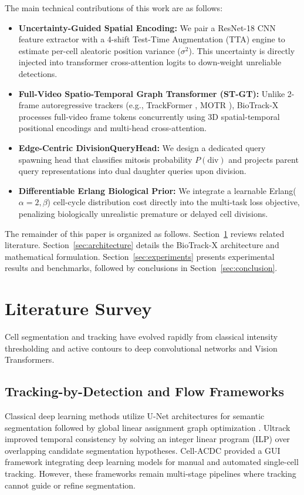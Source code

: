 \documentclass[10pt,journal,compsoc]{IEEEtran}
\begin{document}
The main technical contributions of this work are as follows:
\begin{itemize}
    \item \textbf{Uncertainty-Guided Spatial Encoding:} We pair a ResNet-18 CNN feature extractor with a 4-shift Test-Time Augmentation (TTA) engine to estimate per-cell aleatoric position variance ($\sigma^2$). This uncertainty is directly injected into transformer cross-attention logits to down-weight unreliable detections.
    \item \textbf{Full-Video Spatio-Temporal Graph Transformer (ST-GT):} Unlike 2-frame autoregressive trackers (e.g., TrackFormer \cite{trackformer}, MOTR \cite{motr}), BioTrack-X processes full-video frame tokens concurrently using 3D spatial-temporal positional encodings and multi-head cross-attention.
    \item \textbf{Edge-Centric DivisionQueryHead:} We design a dedicated query spawning head that classifies mitosis probability $P(\text{div})$ and projects parent query representations into dual daughter queries upon division.
    \item \textbf{Differentiable Erlang Biological Prior:} We integrate a learnable Erlang($\alpha=2, \beta$) cell-cycle distribution cost directly into the multi-task loss objective, penalizing biologically unrealistic premature or delayed cell divisions.
\end{itemize}

The remainder of this paper is organized as follows. Section~\ref{sec:literature} reviews related literature. Section~\ref{sec:architecture} details the BioTrack-X architecture and mathematical formulation. Section~\ref{sec:experiments} presents experimental results and benchmarks, followed by conclusions in Section~\ref{sec:conclusion}.

\section{Literature Survey}
\label{sec:literature}
Cell segmentation and tracking have evolved rapidly from classical intensity thresholding and active contours to deep convolutional networks and Vision Transformers.

\subsection{Tracking-by-Detection and Flow Frameworks}
Classical deep learning methods utilize U-Net architectures for semantic segmentation followed by global linear assignment graph optimization \cite{ultrack}. Ultrack \cite{ultrack} improved temporal consistency by solving an integer linear program (ILP) over overlapping candidate segmentation hypotheses. Cell-ACDC \cite{cellacdc} provided a GUI framework integrating deep learning models for manual and automated single-cell tracking. However, these frameworks remain multi-stage pipelines where tracking cannot guide or refine segmentation.
\end{document}
